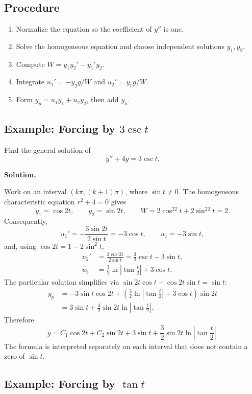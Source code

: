 \documentclass[11pt]{article}
\newenvironment{solution}
    {\par\noindent\textbf{Solution.}\par}
    {\par}
\begin{document}
\subsection{Procedure}

\begin{enumerate}
\item Normalize the equation so the coefficient of \(y''\) is one.
\item Solve the homogeneous equation and choose independent
      solutions \(y_1,y_2\).
\item Compute \(W=y_1y_2'-y_1'y_2\).
\item Integrate \(u_1'=-y_2g/W\) and \(u_2'=y_1g/W\).
\item Form \(y_p=u_1y_1+u_2y_2\), then add \(y_h\).
\end{enumerate}

\subsection{Example: Forcing by \texorpdfstring{$3\csc t$}{3 csc t}}

Find the general solution of
\[
y''+4y=3\csc t.
\]

\begin{solution}
Work on an interval \((k\pi,(k+1)\pi)\), where \(\sin t\ne0\).
The homogeneous characteristic equation \(r^2+4=0\) gives
\[
y_1=\cos2t,\qquad y_2=\sin2t,\qquad
W=2\cos^22t+2\sin^22t=2.
\]
Consequently,
\[
u_1'=-\frac{3\sin2t}{2\sin t}=-3\cos t,
\qquad
u_1=-3\sin t,
\]
and, using \(\cos2t=1-2\sin^2t\),
\[
\begin{aligned}
u_2'
&=\frac{3\cos2t}{2\sin t}
=\frac32\csc t-3\sin t,\\
u_2
&=\frac32\ln\left|\tan\frac{t}{2}\right|+3\cos t.
\end{aligned}
\]
The particular solution simplifies via
\(\sin2t\cos t-\cos2t\sin t=\sin t\):
\[
\begin{aligned}
y_p
&=-3\sin t\cos2t
+\left(\frac32\ln\left|\tan\frac{t}{2}\right|
  +3\cos t\right)\sin2t\\
&=3\sin t+\frac32\sin2t
  \ln\left|\tan\frac{t}{2}\right|.
\end{aligned}
\]
Therefore
\[
\boxed{y=C_1\cos2t+C_2\sin2t+3\sin t
+\frac32\sin2t\ln\left|\tan\frac{t}{2}\right|.}
\]
The formula is interpreted separately on each interval that does not
contain a zero of \(\sin t\).
\end{solution}

\subsection{Example: Forcing by \texorpdfstring{$\tan t$}{tan t}}
\end{document}
